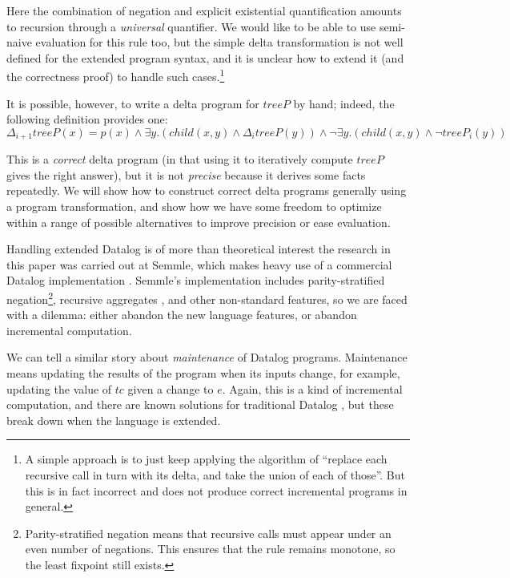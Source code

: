 Here the combination of negation and explicit existential quantification amounts
to recursion through a \emph{universal} quantifier. We would
like to be able to use semi-naive evaluation for this rule too, but the simple delta
transformation is not well defined for the extended program syntax, and it is unclear how to extend it (and the
correctness proof) to handle such cases.\footnote{A simple approach is to just
  keep applying the algorithm of ``replace each recursive call in turn with its
  delta, and take the union of each of those''. But this is in fact incorrect
  and does not produce correct incremental programs in general.}

It is possible, however, to write a delta program for $treeP$ by hand; indeed,
the following definition provides one:
\begin{displaymath}
  \Delta_{i+1}treeP(x) = p(x) \wedge \exists y. (child(x, y) \wedge
  \Delta_itreeP(y)) \wedge \neg \exists y. (child(x,y) \wedge \neg treeP_i(y))
\end{displaymath}

This is a \emph{correct} delta program (in that using it to iteratively compute
$treeP$ gives the right answer), but it is not \emph{precise} because it
derives some facts repeatedly. We will show how to construct correct delta
programs generally using a program transformation, and show how we have some
freedom to optimize within a range of possible alternatives to improve precision or ease evaluation.

Handling extended Datalog is of more than theoretical interest \textemdash{} the research
in this paper was carried out at Semmle, which
makes heavy use of a commercial Datalog implementation
\autocites{semmleWebsite}{avgustinov2016ql}{sereni2008adding}{schafer2010type}.
Semmle's implementation includes parity-stratified negation\footnote{Parity-stratified negation means that recursive calls must
  appear under an even number of negations. This ensures that the rule remains
  monotone, so the least fixpoint still exists.},
recursive aggregates \autocite{demoor2013aggregates}, and other non-standard
features, so we are faced with a dilemma: either abandon the new language
features, or abandon incremental computation.

We can tell a similar story about \emph{maintenance} of Datalog programs.
Maintenance means updating the results of the program when its inputs change,
for example, updating the value of $tc$ given a change to $e$. Again, this is a
kind of incremental computation, and there are known solutions for traditional Datalog
\autocite{gupta1993maintaining}, but these break down when the language is extended.

